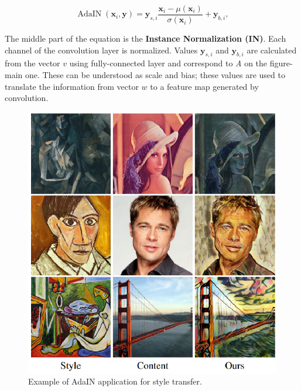 \documentclass[12pt,a4paper,openany]{book}
\begin{document}
\begin{equation}
\operatorname{AdaIN}\left(\mathbf{x}_{i}, \mathbf{y}\right)=\mathbf{y}_{s, i} \frac{\mathbf{x}_{i}-\mu\left(\mathbf{x}_{i}\right)}{\sigma\left(\mathbf{x}_{i}\right)}+\mathbf{y}_{b, i},
\end{equation}


The middle part of the equation is the \textbf{Instance Normalization (IN)}. Each channel of the convolution layer is normalized. Values $\textbf{y}_{s,i}$ and $\textbf{y}_{b,i}$ are calculated from the vector $v$ using fully-connected layer and correspond to \textit{A} on the figure-main one. These can be understood as scale and bias; these values are used to translate the information from vector $w$ to a feature map generated by convolution.

\begin{figure}[ht!]
    \centering
    \includegraphics[scale=1.0]{figs/adaptive-instance-norm.eps}
    \caption{Example of AdaIN application for style transfer.}\label{Fig:STYLEGAN}
\end{figure}
\end{document}
